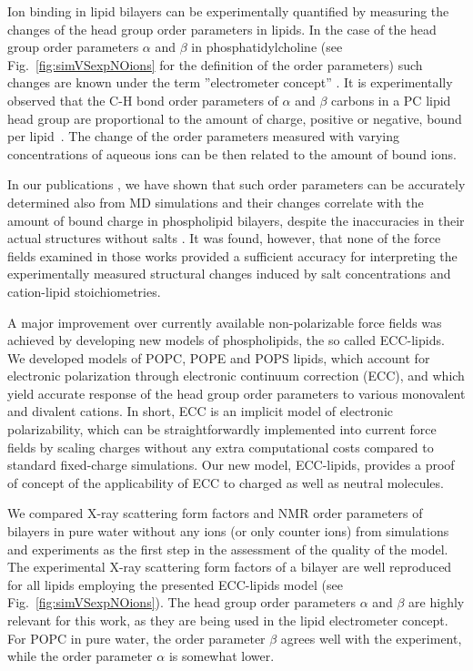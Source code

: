 \documentclass[12pt,a4paper,twoside,openright]{report}
\begin{document}
Ion binding in lipid bilayers can be experimentally quantified
by measuring the changes of the head group order parameters in lipids.
In the case of the head group order parameters $\alpha$ and $\beta$ in phosphatidylcholine
(see Fig.~\ref{fig:simVSexpNOions} for the definition of the order parameters)
such changes are known under the term ''electrometer concept'' \citep{seelig87,catte16, ollila16}. 
It is experimentally observed that the C-H bond
order parameters of $\alpha$ and $\beta$ carbons in a PC lipid head group
are proportional to the amount of charge, positive or negative, bound per lipid~\citep{seelig87}.
The change of the order parameters measured with varying concentrations of aqueous ions 
can be then related to the amount of bound ions.


In our publications \citep{catte16, nmrlipids_proj4},
we have shown that such order parameters can be accurately determined also from MD simulations
and their changes correlate with the amount of bound charge in phospholipid bilayers, 
despite the inaccuracies in their actual structures without salts \citep{botan15}. 
It was found, however, that
none of the force fields examined in those works 
provided a sufficient accuracy for interpreting 
the experimentally measured structural changes induced by salt concentrations
and cation-lipid stoichiometries. 


A major improvement over currently available non-polarizable force fields
was achieved by developing new models of phospholipids, 
the so called ECC-lipids.
We developed models of POPC, POPE and POPS lipids,
which account for electronic polarization through electronic continuum correction (ECC), 
and which yield accurate response of the head group order parameters to various monovalent and divalent cations. \citep{melcr18}
In short, 
ECC is an implicit model of electronic polarizability,
which can be straightforwardly implemented into current force fields 
by scaling charges
without any extra computational costs compared to standard fixed-charge simulations. 
Our new model, ECC-lipids,
provides a proof of concept of the applicability of ECC
to charged as well as neutral molecules. 

We compared X-ray scattering form factors and NMR order parameters of bilayers
in pure water without any ions (or only counter ions)
from simulations and experiments
as the first step in the assessment of the quality of the model. 
The experimental X-ray scattering form factors 
of a bilayer are well reproduced for all lipids employing the presented ECC-lipids model 
(see Fig.~\ref{fig:simVSexpNOions}). 
The head group order parameters $\alpha$ and $\beta$ are highly relevant for this work,
as they are being used in the lipid electrometer concept. 
For POPC in pure water, the order parameter $\beta$ agrees well with the experiment, 
while the order parameter $\alpha$ is somewhat lower. 
\end{document}
